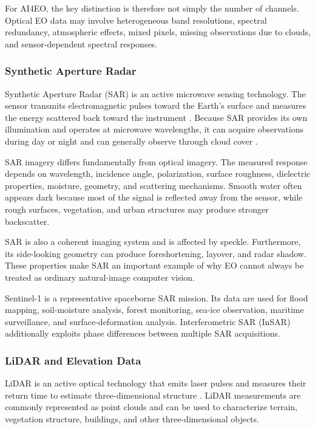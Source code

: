 \documentclass[
    11pt,
    a4paper,
    parskip=half,
    bibliography=totoc,
    numbers=noenddot
]{scrartcl}
\begin{document}
For AI4EO, the key distinction is therefore not simply the number of
channels. Optical EO data may involve heterogeneous band resolutions,
spectral redundancy, atmospheric effects, mixed pixels, missing
observations due to clouds, and sensor-dependent spectral responses.

\subsubsection{Synthetic Aperture Radar}

Synthetic Aperture Radar (SAR) is an active microwave sensing technology.
The sensor transmits electromagnetic pulses toward the Earth's surface
and measures the energy scattered back toward the instrument
\cite{moreira2013sar}. Because SAR provides its own illumination and
operates at microwave wavelengths, it can acquire observations during
day or night and can generally observe through cloud cover
\cite{esa_sentinel1_instrument}.

SAR imagery differs fundamentally from optical imagery. The measured
response depends on wavelength, incidence angle, polarization, surface
roughness, dielectric properties, moisture, geometry, and scattering
mechanisms. Smooth water often appears dark because most of the signal
is reflected away from the sensor, while rough surfaces, vegetation, and
urban structures may produce stronger backscatter.

SAR is also a coherent imaging system and is affected by speckle.
Furthermore, its side-looking geometry can produce foreshortening,
layover, and radar shadow. These properties make SAR an important
example of why EO cannot always be treated as ordinary natural-image
computer vision.

Sentinel-1 is a representative spaceborne SAR mission. Its data are used
for flood mapping, soil-moisture analysis, forest monitoring, sea-ice
observation, maritime surveillance, and surface-deformation analysis.
Interferometric SAR (InSAR) additionally exploits phase differences
between multiple SAR acquisitions.

\subsubsection{LiDAR and Elevation Data}

LiDAR is an active optical technology that emits laser pulses and
measures their return time to estimate three-dimensional structure
\cite{baltsavias1999airborne}. LiDAR measurements are commonly
represented as point clouds and can be used to characterize terrain,
vegetation structure, buildings, and other three-dimensional objects.
\end{document}
